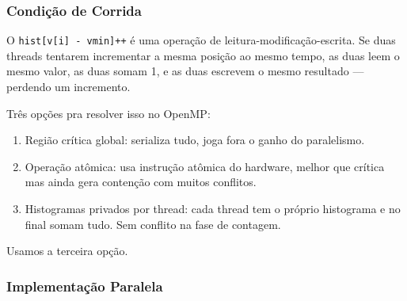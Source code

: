 \documentclass[12pt]{article}
\begin{document}
\subsubsection{Condição de Corrida}

O \texttt{hist[v[i] - vmin]++} é uma operação de leitura-modificação-escrita. Se duas threads tentarem incrementar a mesma posição ao mesmo tempo, as duas leem o mesmo valor, as duas somam 1, e as duas escrevem o mesmo resultado --- perdendo um incremento.

Três opções pra resolver isso no OpenMP:
\begin{enumerate}
    \item Região crítica global: serializa tudo, joga fora o ganho do paralelismo.
    \item Operação atômica: usa instrução atômica do hardware, melhor que crítica mas ainda gera contenção com muitos conflitos.
    \item Histogramas privados por thread: cada thread tem o próprio histograma e no final somam tudo. Sem conflito na fase de contagem.
\end{enumerate}

Usamos a terceira opção.

\subsubsection{Implementação Paralela}
\end{document}
